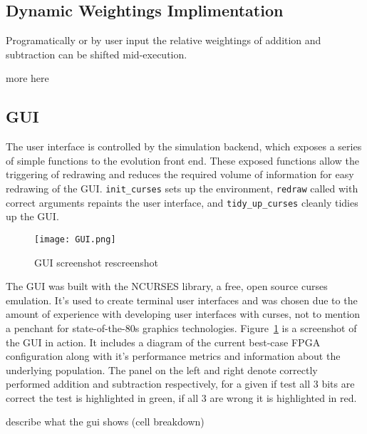 \subsection{Dynamic Weightings Implimentation}
Programatically or by user input the relative weightings of addition and subtraction
can be shifted mid-execution.

\todo more here

\subsection{GUI}
The user interface is controlled by the simulation backend, which exposes a
series of simple functions to the evolution front end. These exposed functions
allow the triggering of redrawing and reduces the required volume of information
for easy redrawing of the GUI. \texttt{init\_curses} sets up the environment,
\texttt{redraw} called with correct arguments repaints the user interface, and
\texttt{tidy\_up\_curses} cleanly tidies up the GUI.

\begin{figure}
\texttt{[image: GUI.png]}
\caption{GUI screenshot \todo rescreenshot}
\label{fig:gui}
\end{figure}

The GUI was built with the NCURSES library, a free, open source curses emulation.
It's used to create terminal user interfaces and was chosen due to the amount of
experience  with developing user interfaces with curses, not to
mention a penchant for state-of-the-80s graphics technologies.
Figure~\ref{fig:gui} is a screenshot of the GUI in action. It includes a diagram
of the current best-case FPGA configuration along with it's performance metrics
and information about the underlying population. The panel on the left and right
denote correctly performed addition and subtraction respectively, for a given
if test all 3 bits are correct the test is highlighted in green, if all 3 are wrong
it is highlighted in red.

\todo describe what the gui shows (cell breakdown)

